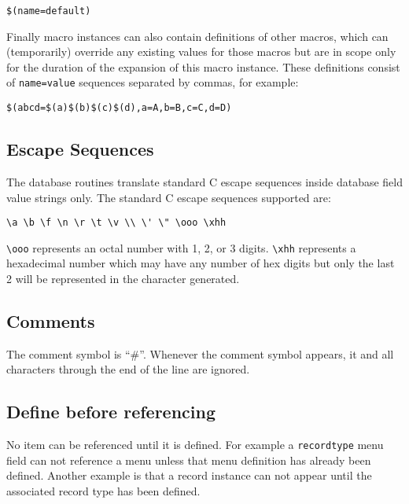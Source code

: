 \begin{verbatim}
$(name=default)
\end{verbatim}

Finally macro instances can also contain definitions of other macros, which can (temporarily) override any existing values 
for those macros but are in scope only for the duration of the expansion of this macro instance. These definitions consist 
of \verb|name=value| sequences separated by commas, for example:

\begin{verbatim}
$(abcd=$(a)$(b)$(c)$(d),a=A,b=B,c=C,d=D)
\end{verbatim}

\subsection{Escape Sequences}

The database routines translate standard C escape sequences inside database field value strings only. The standard C 
escape sequences supported are:

\begin{verbatim}
\a \b \f \n \r \t \v \\ \' \" \ooo \xhh
\end{verbatim}

\verb|\ooo| represents an octal number with 1, 2, or 3 digits.
\verb|\xhh| represents a hexadecimal number which may have any number of hex digits but only the last 2 will be represented in the character generated.

\subsection{Comments}

The comment symbol is ``\#''.
Whenever the comment symbol appears, it and all characters through the end of the line are ignored.

\subsection{Define before referencing}

No item can be referenced until it is defined.
For example a \verb|recordtype| menu field can not reference a menu unless that menu definition has already been defined.
Another example is that a record instance can not appear until the associated record type has been defined.

